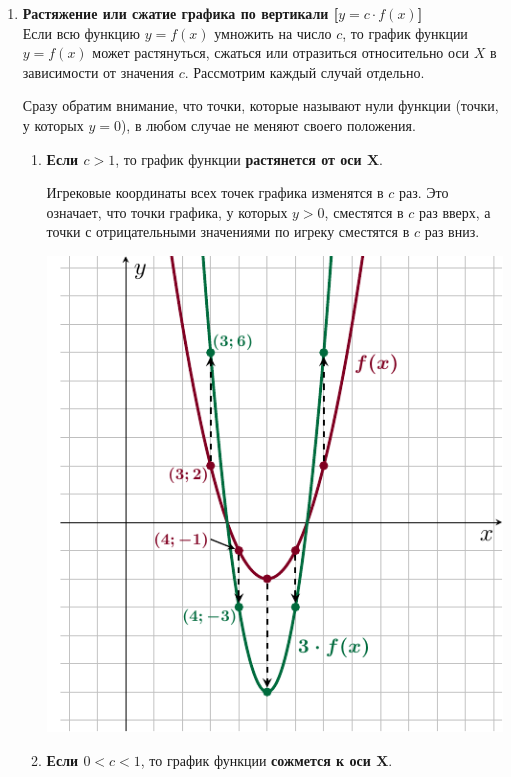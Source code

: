 \documentclass[10pt, a4paper]{article}
\begin{document}
\begin{enumerate}
\begin{enumerate}[label=\asbuk*)]
\begin{minipage}[t]{0.4\textwidth}
\begin{center}
		\end{center}
		\end{minipage}
	\end{enumerate}
	\item \textbf{Растяжение или сжатие графика по вертикали [\boldmath$y=c\cdot f(x)$]}\\[1em]
	Если всю функцию $y=f(x)$ умножить на число $c$, то график функции $y=f(x)$ может растянуться, сжаться или отразиться относительно оси $X$ в зависимости от значения $c$. Рассмотрим каждый случай отдельно.
	
	Сразу обратим внимание, что точки, которые называют нули функции (точки, у которых $y=0$), в любом случае не меняют своего положения.
	\begin{enumerate}[label=\asbuk*), itemsep=1em]
		\item 
		\begin{minipage}[t]{0.65\textwidth}
			\textbf{Если \boldmath$ c>1$}, то график функции \textbf{растянется от оси $\boldsymbol X$}.\smallskip
			
			Игрековые координаты всех точек графика изменятся в $c$ раз. Это означает, что точки графика, у которых $y>0$, сместятся в $c$ раз вверх, а точки с отрицательными значениями по игреку сместятся в $c$ раз вниз.
		\end{minipage}
		\begin{minipage}[t]{0.25\textwidth}
			\includegraphics[align=t, width=\textwidth]{../graphs/graph_6/graph_6}
		\end{minipage}
		\item
		\begin{minipage}[t]{0.65\textwidth}
			\textbf{Если \boldmath$0<c<1$}, то график функции \textbf{сожмется к оси $\boldsymbol X$}.\smallskip
			

\end{minipage}
\end{enumerate}
\end{enumerate}
\end{document}
